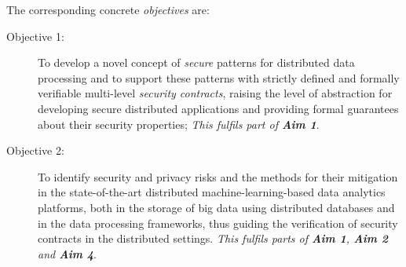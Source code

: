 \documentclass[a4paper,11pt]{article}
\begin{document}
The corresponding concrete \emph{objectives} are: 
\begin{description}

 
\item[Objective 1:] To develop a novel concept of \emph{secure} patterns for distributed data processing and to support these
patterns with strictly defined and formally verifiable multi-level \emph{security contracts}, raising the level of abstraction
for developing secure distributed applications and providing formal guarantees about their security properties; 
\emph{This fulfils part of \textbf{Aim 1}}. 

\item[Objective 2:] To identify security and privacy risks and the methods for their mitigation
  in the state-of-the-art distributed machine-learning-based
  data analytics platforms, both in the storage of big data using distributed databases and in the data processing
  frameworks, thus guiding the verification of security contracts in the distributed settings. \emph{This fulfils parts
    of \textbf{Aim 1}, \textbf{Aim 2} and \textbf{Aim 4}}.
  

\end{description}
\end{document}
